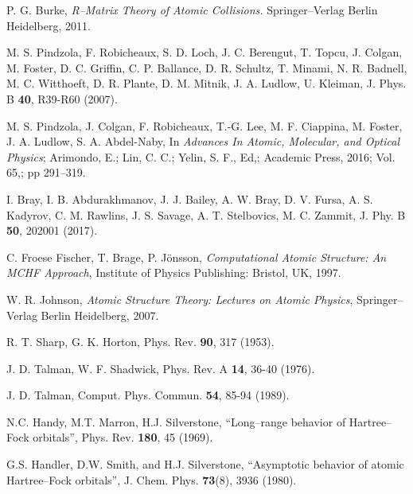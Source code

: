 \begin{thebibliography}{9}
P. G. Burke, 
\textit{R--Matrix Theory of Atomic Collisions.}
Springer--Verlag Berlin Heidelberg, 2011.

M. S. Pindzola, F. Robicheaux, S. D. Loch, J. C. Berengut, T. Topcu, 
J. Colgan, M. Foster, D. C. Griffin, C. P. Ballance, D. R. Schultz,
T. Minami, N. R. Badnell, M. C. Witthoeft, D. R. Plante, D. M. Mitnik, 
J. A. Ludlow, U. Kleiman, 
J. Phys. B \textbf{40}, R39-R60 (2007).

M. S. Pindzola, J. Colgan, F. Robicheaux, T.-G. Lee, M. F. Ciappina,
M. Foster, J. A. Ludlow, S. A. Abdel-Naby,
In \textit{Advances In Atomic, Molecular, and Optical Physics};
Arimondo, E.; Lin, C. C.; Yelin, S. F., Ed,; 
Academic Press, 2016; Vol. 65,; pp 291--319.


I. Bray, I. B. Abdurakhmanov, J. J. Bailey, A. W. Bray, D. V. Fursa,
A. S. Kadyrov, C. M. Rawlins, J. S. Savage, A. T. Stelbovics, M. C. Zammit,
J. Phy. B \textbf{50}, 202001 (2017).


C. Froese Fischer, T. Brage, P. J\"onsson,
\textit{Computational Atomic Structure: An MCHF Approach},
Institute of Physics Publishing: Bristol, UK, 1997.

W. R. Johnson, 
\textit{Atomic Structure Theory: Lectures on Atomic Physics},
Springer--Verlag Berlin Heidelberg, 2007.

R. T. Sharp, G. K. Horton,
Phys. Rev. \textbf{90}, 317 (1953).

J. D. Talman, W. F. Shadwick, 
Phys. Rev. A \textbf{14}, 36-40 (1976).

J. D. Talman, 
Comput. Phys. Commun. \textbf{54}, 85-94 (1989).


N.C. Handy, M.T. Marron, H.J. Silverstone, 
``Long--range behavior of Hartree--Fock orbitals'',
Phys. Rev. {\bf 180}, 45 (1969).

G.S. Handler, D.W. Smith, and H.J. Silverstone, 
``Asymptotic behavior of atomic Hartree--Fock orbitals'',
J. Chem. Phys. {\bf 73}(8), 3936 (1980).


\end{thebibliography}
